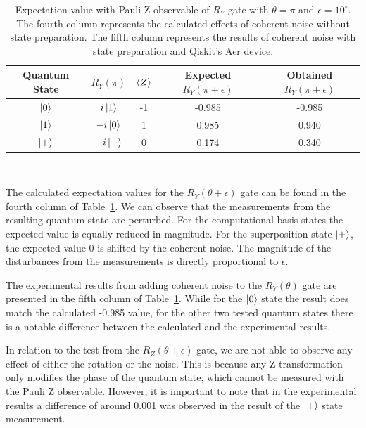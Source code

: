 \begin{table}[h]
  \centering
  \begin{tabular}{|c|c|c|c|c|}
    \hline
    Quantum State & \(R_{Y}\left(\pi\right)\) & \(\expval{Z}\) & Expected \(R_{Y}\left(\pi+\epsilon\right)\) & Obtained \(R_{Y}\left(\pi+\epsilon\right)\) \\
    \hline
    \(\ket{0}\) & \(i\ket{1}\)  & -1 & -0.985 & -0.985 \\
    \hline
    \(\ket{1}\) & \(-i\ket{0}\) &  1 &  0.985 &  0.940 \\
    \hline
    \(\ket{+}\) & \(-i\ket{-}\) &  0 &  0.174 &  0.340 \\
    \hline
  \end{tabular}
  \caption{Expectation value with Pauli Z observable of \(R_{Y}\) gate with \(\theta = \pi\) and \(\epsilon = 10^{\circ}\).
  The fourth column represents the calculated effects of coherent noise without state preparation.
  The fifth column represents the results of coherent noise with state preparation and Qiskit's Aer device.}\label{tab:ry_noise}
\end{table} \

The calculated expectation values for the \(R_{Y}(\theta + \epsilon)\) gate
can be found in the fourth column of Table~\ref{tab:ry_noise}. We can
observe that the measurements from the resulting quantum state are
perturbed. For the computational basis states the expected value is
equally reduced in magnitude. For the superposition state \(\ket{+}\),
the expected value 0 is shifted by the coherent noise. The magnitude
of the disturbances from the measurements is directly proportional to
\(\epsilon\). \

The experimental results from adding coherent noise to the
\(R_{Y}(\theta)\) gate are presented in the fifth column of Table~\ref{tab:ry_noise}. 
While for the \(\ket{0}\) state the result does match the calculated
-0.985 value, for the other two tested quantum states there is a
notable difference between the calculated and the experimental results. \

In relation to the test from the \(R_{Z}(\theta + \epsilon)\) gate, we
are not able to observe any effect of either the rotation or the noise.
This is because any Z transformation only modifies the phase of the
quantum state, which cannot be measured with the Pauli Z observable.
However, it is important to note that in the experimental results
a difference of around 0.001 was observed in the result of the \(\ket{+}\)
state measurement. \

